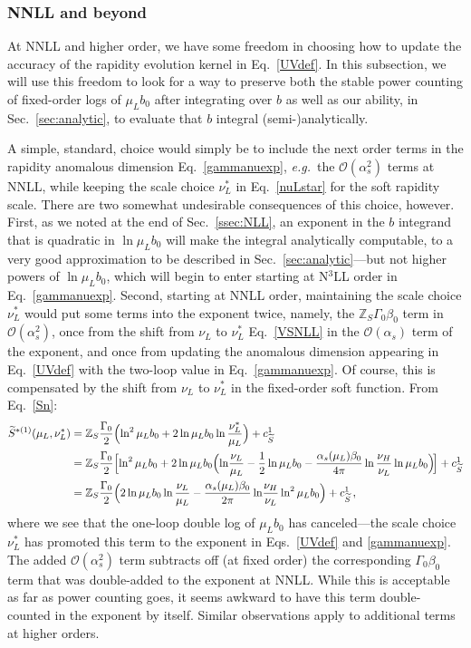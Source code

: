 \documentclass[a4,letterpaper,11pt]{article}
\newcommand{\nn}{\nonumber}
\newcommand{\as}{\alpha_s}
\newcommand{\eg}{\emph{e.g.}~}
\newcommand{\cO}{\mathcal{O}}
\newcommand{\zed}{\mathbb{Z}}
\newcommand{\wt}{\widetilde}
\newcommand{\eq}[1]{Eq.~\eqref{#1}}
\newcommand{\eqs}[2]{Eqs.~\eqref{#1} and \eqref{#2}}
\renewcommand{\sec}[1]{Sec.~\ref{sec:#1}}
\newcommand{\ssec}[1]{Sec.~\ref{ssec:#1}}
\begin{document}
\subsubsection{NNLL and beyond}
\label{ssec:NNLLbeyond}

At NNLL and higher order, we have some freedom in choosing how to update the accuracy of the rapidity evolution kernel in \eq{UVdef}. In this subsection, we will use this freedom to look for a way to preserve both the stable power counting of fixed-order logs of $\mu_L b_0$ after integrating over $b$ as well as our ability, in \sec{analytic}, to evaluate that $b$ integral (semi-)analytically.

A simple, standard, choice would simply be to include the next order terms in the rapidity anomalous dimension \eq{gammanuexp}, \eg the $\cO(\as^2)$ terms at NNLL, while keeping the scale choice $\nu_L^*$ in \eq{nuLstar} for the soft rapidity scale. There are two somewhat undesirable consequences of this choice, however. First, as we noted at the end of \ssec{NLL}, an exponent in the $b$ integrand that is quadratic in $\ln\mu_L b_0$ will make the integral analytically computable, to a very good approximation to be described in \sec{analytic}---but not higher powers of $\ln\mu_L b_0$, which will begin to enter starting at N$^3$LL order in \eq{gammanuexp}. Second, starting at NNLL order, maintaining the scale choice $\nu_L^*$ would put some terms into the exponent twice, namely, the $\zed_S \Gamma_0\beta_0$ term in $\cO(\as^2)$, once from the shift from $\nu_L$ to $\nu_L^*$ \eq{VSNLL} in the $\cO(\as)$ term of the exponent, and once from updating the anomalous dimension appearing in \eq{UVdef} with the two-loop value in \eq{gammanuexp}. Of course, this is compensated by the shift from $\nu_L$ to $\nu_L^*$ in the fixed-order soft function.  From \eq{Sn}:
\begin{align}
\label{Snustar}
\wt S^{*(1)}(\mu_L,\nu_L^*) &= \zed_S \frac{\Gamma_0}{2}\Bigl(\ln^2 \mu_L b_0 + 2\ln \mu_L b_0 \ln\frac{\nu_L^*}{\mu_L}\Bigr) + c_{\wt S}^1 \\
&=  \zed_S \frac{\Gamma_0}{2}\Bigl[\ln^2 \mu_L b_0 + 2\ln \mu_L b_0 \Bigl( \ln\!\frac{\nu_L}{\mu_L} - \frac{1}{2} \ln\mu_L b_0 - \frac{\as(\mu_L)\beta_0}{4\pi} \ln\frac{\nu_H}{\nu_L}\ln \mu_L b_0\Bigr)\!\Bigr] + c_{\wt S}^1 \nn \\
&= \zed_S \frac{\Gamma_0}{2} \Bigl( 2\ln \mu_L b_0\ln\frac{\nu_L}{\mu_L} - \frac{\as(\mu_L)\beta_0}{2\pi}\ln\! \frac{\nu_H}{\nu_L} \ln^2\mu_L b_0\Bigr) + c_{\wt S}^1\,,\nn
\end{align}
where we see that the one-loop double log of $\mu_L b_0$ has canceled---the scale choice $\nu_L^*$ has promoted this term to the exponent in \eqs{UVdef}{gammanuexp}. The added $\cO(\as^2)$ term subtracts off (at fixed order) the corresponding $\Gamma_0\beta_0$ term that was double-added to the exponent at NNLL. While this is acceptable as far as power counting goes, it seems awkward to have this term double-counted in the exponent by itself. Similar observations apply to additional terms at higher orders.
\end{document}
